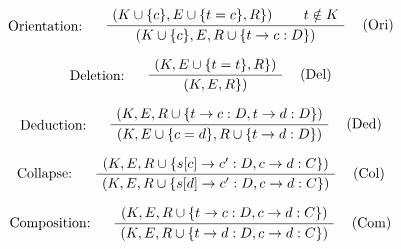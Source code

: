 \documentclass[twoside,a4paper]{article}
\theoremstyle{definition}
\begin{document}
\[
\AxiomC{$(K \cup \{c\},E \cup \{t = c \},R\})$}
\AxiomC{$t \notin K$}
\LeftLabel{Orientation: \quad}
\RightLabel{\quad (Ori)}
\BinaryInfC{$(K \cup \{c\},E,R \cup \{t \rightarrow c : D\})$}
\DisplayProof
\]

\[
\AxiomC{$(K,E \cup \{t = t \},R\})$}
\LeftLabel{Deletion: \quad}
\RightLabel{\quad (Del)}
\UnaryInfC{$(K,E,R\})$}
\DisplayProof
\]

\[
\AxiomC{$(K,E,R \cup \{t \rightarrow c : D , t \rightarrow d : D \})$}
\LeftLabel{Deduction: \quad}
\RightLabel{\quad (Ded)}
\UnaryInfC{$(K,E \cup \{c = d \},R \cup \{t \rightarrow d : D\})$}
\DisplayProof
\]

\[
\AxiomC{$(K,E,R \cup \{s[c] \rightarrow c' : D , c \rightarrow d : C \})$}
\LeftLabel{Collapse: \quad}
\RightLabel{\quad (Col)}
\UnaryInfC{$(K,E,R \cup \{s[d] \rightarrow c' : D , c \rightarrow d : C \})$}
\DisplayProof
\]

\[
\AxiomC{$(K,E,R \cup \{t \rightarrow c : D , c \rightarrow d : C \})$}
\LeftLabel{Composition: \quad}
\RightLabel{\quad (Com)}
\UnaryInfC{$(K,E,R \cup \{t \rightarrow d : D , c \rightarrow d : C \})$}
\DisplayProof
\]



\end{document}
